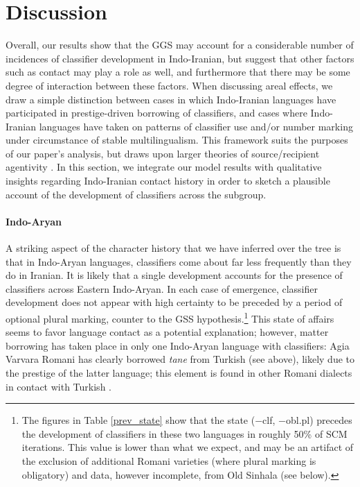 \documentclass[11pt]{article}
\begin{document}
\section{Discussion}
Overall, our results show that the GGS may account for a considerable number of incidences of classifier development in Indo-Iranian, but suggest that other factors such as contact may play a role as well, and furthermore that there may be some degree of interaction between these factors. 
When discussing areal effects, we draw a simple distinction between cases in which Indo-Iranian languages have participated in prestige-driven borrowing of classifiers, and cases where Indo-Iranian languages have taken on patterns of classifier use and/or number marking under circumstance of stable multilingualism. This framework suits the purposes of our paper's analysis, but draws upon larger theories of source/recipient agentivity \citep{Ross1996,Winford2005,MatrasSakel2007}. 
In this section, we integrate our model results with qualitative insights regarding Indo-Iranian contact history in order to sketch a plausible account of the development of classifiers across the subgroup. 

\paragraph{Indo-Aryan}
A striking aspect of the character history that we have inferred over the tree is that in Indo-Aryan languages, classifiers come about far less frequently than they do in Iranian. It is likely that a single development accounts for the presence of classifiers across Eastern Indo-Aryan. 
In each case of emergence, classifier development does not appear with high certainty to be preceded by a period of optional plural marking, counter to the GSS hypothesis.\footnote{The figures in Table \ref{prev_state} show that the state ($-${\sc clf}, $-${\sc obl.pl}) precedes the development of classifiers in these two languages in roughly 50\% of SCM iterations. This value is lower than what we expect, and may be an artifact of the exclusion of additional Romani varieties (where plural marking is obligatory) and data, however incomplete, from Old Sinhala (see below).} 
This state of affairs seems to favor language contact as a potential explanation; however, matter borrowing has taken place in only one Indo-Aryan language with classifiers: 
Agia Varvara Romani has clearly borrowed {\it tane} from Turkish (see above), likely due to the prestige of the latter language; this element is found in other Romani dialects in contact with Turkish \citep[204]{Matras2002}. 
\end{document}
